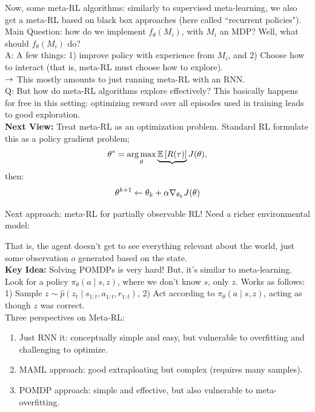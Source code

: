 Now, some meta-RL algorithms: similarly to supervised meta-learning, we also get a meta-RL based on black box approaches (here called ``recurrent policies"). \\

Main Question: how do we implement $f_\theta(M_i)$, with $M_i$ an MDP? Well, what should $f_\theta(M_i)$ do? \\

A: A few things: 1) improve policy with experience from $M_i$, and 2) Choose how to interact (that is, meta-RL must choose how to explore). \\

$\rightarrow$ This mostly amounts to just running meta-RL with an RNN. \\

Q: But how do meta-RL algorithms explore effectively? This basically happens for free in this setting: optimizing reward over all episodes used in training leads to good exploration.  \\

{\bf Next View:} Treat meta-RL as an optimization problem. Standard RL formulate this as a policy gradient problem;
\[
\theta^* = \operatorname*{arg\,max}_\theta \underbrace{\mathbb{E} \left[R(\tau)\right]}{J(\theta)},
\]
then:
\[
\theta^{k+1} \leftarrow \theta_k + \alpha \nabla_{\theta_k} J(\theta)
\]


Next approach: meta-RL for partially observable RL! Need a richer environmental model:

That is, the agent doesn't get to see everything relevant about the world, just some observation $o$ generated based on the state. \\

{\bf Key Idea:} Solving POMDPs is very hard! But, it's similar to meta-learning. Look for a policy $\pi_\theta(a \mid s, z)$, where we don't know $s$, only $z$. Works as follows: 1) Sample $z \sim \hat{p}(z_t \mid s_{1:t}, a_{1:t}, r_{1:t})$, 2) Act according to $\pi_\theta(a\mid s, z)$, acting as though $z$ was correct. \\


Three perspectives on Meta-RL:
\begin{enumerate}
\item Just RNN it: conceptually simple and easy, but vulnerable to overfitting and challenging to optimize.
\item MAML approach: good extraploating but complex (requires many samples).
\item POMDP approach: simple and effective, but also vulnerable to meta-overfitting.
\end{enumerate}

